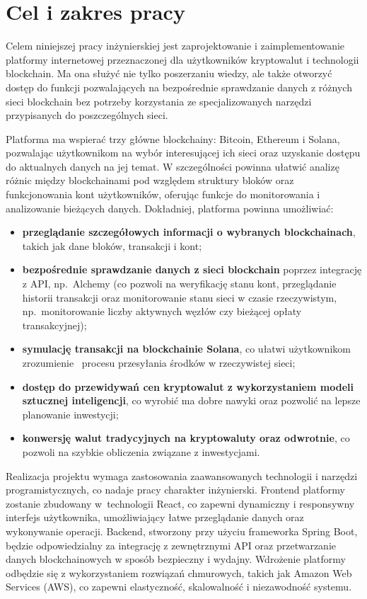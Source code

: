 \section{Cel i zakres pracy}
Celem niniejszej pracy inżynierskiej jest zaprojektowanie i zaimplementowanie platformy internetowej przeznaczonej dla użytkowników kryptowalut i technologii blockchain. Ma ona służyć nie tylko poszerzaniu wiedzy, ale także otworzyć dostęp do funkcji pozwalających na bezpośrednie sprawdzanie danych z różnych sieci blockchain bez potrzeby korzystania ze specjalizowanych narzędzi przypisanych do poszczególnych sieci.

Platforma ma wspierać trzy główne blockchainy: Bitcoin, Ethereum i Solana, pozwalając użytkownikom na wybór interesującej ich sieci oraz uzyskanie dostępu do aktualnych danych na jej temat. W szczególności powinna ułatwić analizę różnic między blockchainami pod względem struktury bloków oraz funkcjonowania kont użytkowników, oferując funkcje do monitorowania i analizowanie bieżących danych. Dokładniej, platforma powinna umożliwiać:
\begin{itemize}
\item \textbf{przeglądanie szczegółowych informacji o wybranych blockchainach}, takich jak dane bloków, transakcji i kont; 
\item \textbf{bezpośrednie sprawdzanie danych z sieci blockchain} poprzez integrację z API, np.\ Alchemy (co pozwoli na weryfikację stanu kont, przeglądanie historii transakcji oraz monitorowanie stanu sieci  w czasie rzeczywistym, np.\ monitorowanie liczby aktywnych węzłów czy bieżącej opłaty transakcyjnej);
\item \textbf{symulację transakcji na blockchainie Solana}, co ułatwi użytkownikom zrozumienie \ procesu przesyłania środków w rzeczywistej sieci;
\item \textbf{dostęp do przewidywań cen kryptowalut z wykorzystaniem modeli sztucznej inteligencji}, co wyrobić ma dobre nawyki oraz pozwolić na lepsze planowanie inwestycji;
\item \textbf{konwersję walut tradycyjnych na kryptowaluty oraz odwrotnie}, co pozwoli na szybkie obliczenia związane z inwestycjami. 
\end{itemize}

Realizacja projektu wymaga zastosowania zaawansowanych technologii i narzędzi programistycznych, co nadaje pracy charakter inżynierski. Frontend platformy zostanie zbudowany w~technologii React, co zapewni dynamiczny i responsywny interfejs użytkownika, umożliwiający łatwe przeglądanie danych oraz wykonywanie operacji. Backend, stworzony przy użyciu frameworka Spring Boot, będzie odpowiedzialny za integrację z zewnętrznymi API oraz przetwarzanie danych blockchainowych w sposób bezpieczny i wydajny. Wdrożenie platformy odbędzie się z wykorzystaniem rozwiązań chmurowych, takich jak Amazon Web Services (AWS), co zapewni elastyczność, skalowalność i niezawodność systemu.


